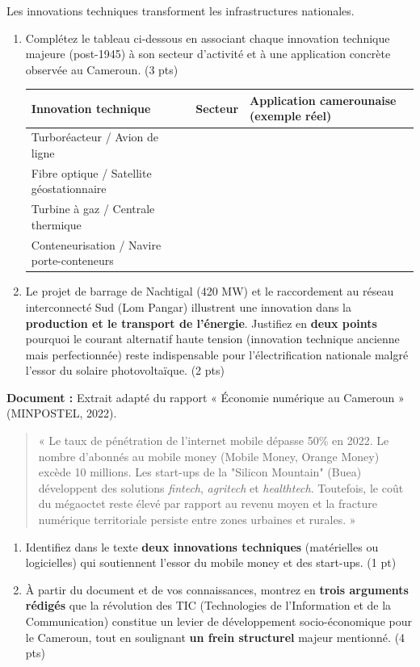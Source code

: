 \documentclass[11pt]{article}
\begin{document}
\begin{exercice}
Les innovations techniques transforment les infrastructures nationales.
\begin{enumerate}
    \item Complétez le tableau ci-dessous en associant chaque innovation technique majeure (post-1945) à son secteur d'activité et à une application concrète observée au Cameroun. \hfill (3 pts)
    \begin{tabular}{|p{3.5cm}|p{3cm}|p{5cm}|}
    \hline
    \textbf{Innovation technique} & \textbf{Secteur} & \textbf{Application camerounaise (exemple réel)} \\
    \hline
    Turboréacteur / Avion de ligne & & \\
    \hline
    Fibre optique / Satellite géostationnaire & & \\
    \hline
    Turbine à gaz / Centrale thermique & & \\
    \hline
    Conteneurisation / Navire porte-conteneurs & & \\
    \hline
    \end{tabular}
    \item Le projet de barrage de Nachtigal (420 MW) et le raccordement au réseau interconnecté Sud (Lom Pangar) illustrent une innovation dans la \textbf{production et le transport de l'énergie}. Justifiez en \textbf{deux points} pourquoi le courant alternatif haute tension (innovation technique ancienne mais perfectionnée) reste indispensable pour l'électrification nationale malgré l'essor du solaire photovoltaïque. \hfill (2 pts)
\end{enumerate}
\end{exercice}

\begin{exercice}
\textbf{Document :} Extrait adapté du rapport « Économie numérique au Cameroun » (MINPOSTEL, 2022).
\begin{quote}
« Le taux de pénétration de l'internet mobile dépasse 50\% en 2022. Le nombre d'abonnés au mobile money (Mobile Money, Orange Money) excède 10 millions. Les start-ups de la "Silicon Mountain" (Buea) développent des solutions \textit{fintech}, \textit{agritech} et \textit{healthtech}. Toutefois, le coût du mégaoctet reste élevé par rapport au revenu moyen et la fracture numérique territoriale persiste entre zones urbaines et rurales. »
\end{quote}
\begin{enumerate}
    \item Identifiez dans le texte \textbf{deux innovations techniques} (matérielles ou logicielles) qui soutiennent l'essor du mobile money et des start-ups. \hfill (1 pt)
    \item À partir du document et de vos connaissances, montrez en \textbf{trois arguments rédigés} que la révolution des TIC (Technologies de l'Information et de la Communication) constitue un levier de développement socio-économique pour le Cameroun, tout en soulignant \textbf{un frein structurel} majeur mentionné. \hfill (4 pts)
\end{enumerate}
\end{exercice}
\end{document}
